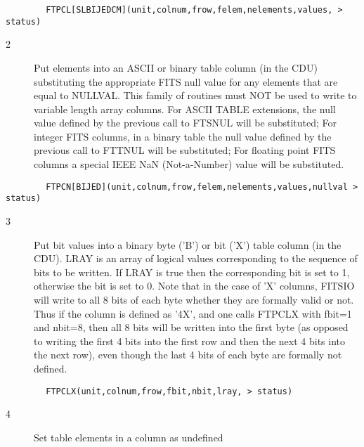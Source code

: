 \documentclass[11pt]{book}
\begin{document}
\begin{verbatim}
        FTPCL[SLBIJEDCM](unit,colnum,frow,felem,nelements,values, > status)
\end{verbatim}

\begin{description}
\item[2 ] Put elements into an ASCII or binary table column (in the CDU)
    substituting the appropriate FITS null value for any elements that
    are equal to NULLVAL.  This family of routines must NOT be used to
    write to  variable length array columns. For ASCII TABLE extensions, the
    null value defined by the previous call to FTSNUL will be substituted;
    For integer FITS columns, in a binary table  the null value
    defined by the previous call to FTTNUL will be substituted;
    For floating point FITS columns a special IEEE NaN (Not-a-Number)
   value will be substituted.
\end{description}

\begin{verbatim}
        FTPCN[BIJED](unit,colnum,frow,felem,nelements,values,nullval > status)
\end{verbatim}

\begin{description}
\item[3 ] Put bit values into a binary byte ('B') or bit ('X') table column (in the
    CDU).  LRAY is an array of logical values corresponding to the sequence of
    bits to be written.  If LRAY is true then the corresponding bit is
    set to 1, otherwise the bit is set to 0.  Note that in the case of
    'X' columns, FITSIO will write to all 8 bits of each byte whether
    they are formally valid or not.  Thus if the column is defined as
    '4X', and one calls FTPCLX with  fbit=1 and nbit=8, then all 8 bits
    will be written into the first byte (as opposed to writing the
    first 4 bits into the first row and then the next 4 bits into the
    next row), even though the last 4 bits of each byte are formally
   not defined.
\end{description}

\begin{verbatim}
        FTPCLX(unit,colnum,frow,fbit,nbit,lray, > status)
\end{verbatim}

\begin{description}
\item[4 ] Set table elements in a column as undefined
\end{description}
\end{document}
